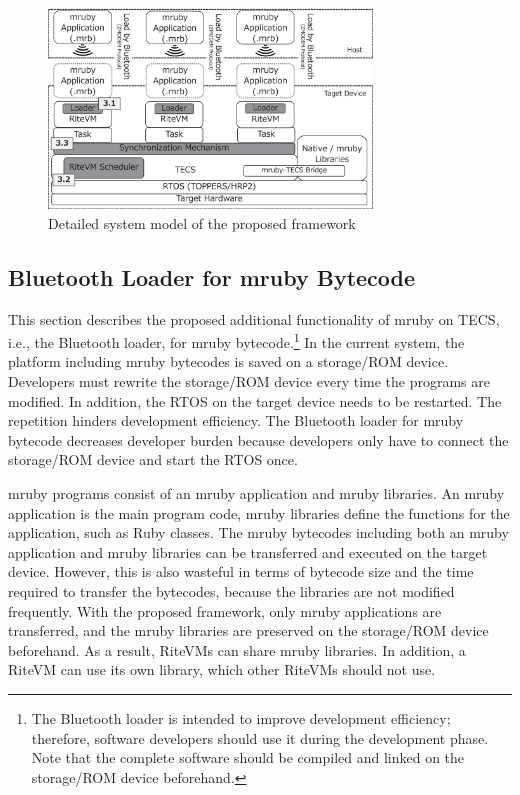 \documentclass{sig-alternate-05-2015}
\begin{document}
\begin{figure}[t]
    \centering
    \includegraphics[width=8.6cm,clip]{figure/system_model.eps}
    \vspace{0.5mm}
\caption{Detailed system model of the proposed framework}
    \vspace{1mm}
\label{fig:system_model}
\end{figure}

\subsection{Bluetooth Loader for mruby Bytecode}
\label{sec:Bluetooth loader for mruby bytecode}
This section describes the proposed additional functionality of mruby on TECS, i.e., the Bluetooth loader, for mruby bytecode.\footnote{
The Bluetooth loader is intended to improve development efficiency; therefore, software developers should use it during the development phase.
Note that the complete software should be compiled and linked on the storage/ROM device beforehand.
}
In the current system, the platform including mruby bytecodes is saved on a storage/ROM device.
Developers must rewrite the storage/ROM device every time the programs are modified.
In addition, the RTOS on the target device needs to be restarted.
The repetition hinders development efficiency.
The Bluetooth loader for mruby bytecode decreases developer burden because developers only have to connect the storage/ROM device and start the RTOS once. 

mruby programs consist of an mruby application and mruby libraries.
An mruby application is the main program code, mruby libraries define the functions for the application, such as Ruby classes. 
The mruby bytecodes including both an mruby application and mruby libraries can be transferred and executed on the target device.
However, this is also wasteful in terms of bytecode size and the time required to transfer the bytecodes, because the libraries are not modified frequently.
With the proposed framework, only mruby applications are transferred, and the mruby libraries are preserved on the storage/ROM device beforehand.
As a result, RiteVMs can share mruby libraries.
In addition, a RiteVM can use its own library, which other RiteVMs should not use.
\end{document}
